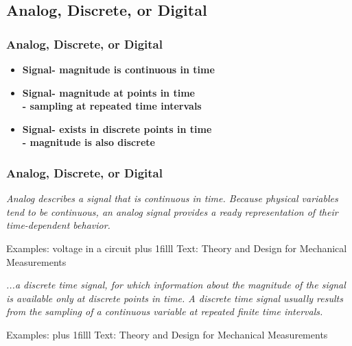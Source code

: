 \documentclass[fleqn]{beamer} %
\newcommand{\sectionIsubsectionIItitle}{Analog, Discrete, or Digital}
\newcommand{\btVFill}{\vskip0pt plus 1filll}
\newcommand{\uhspc}{\underline{\hspace{20 mm}}}
\begin{document}
		\subsection{\sectionIsubsectionIItitle}\label{sectionIsubsectionII}

			\begin{frame}
				\frametitle{\sectionIsubsectionIItitle}

					    \begin{itemize}
			\item \textbf{\uhspc Signal- magnitude is continuous in time }  \vspace{3mm} \\
			\item \textbf{\uhspc Signal- magnitude at points in time}  \vspace{3mm} \\
			\textbf{ \hspace*{15mm} - sampling at repeated time intervals}  \vspace{3mm} \\
			\item \textbf{\uhspc Signal- exists in discrete points in time}  \vspace{3mm} \\
			\textbf{ \hspace*{15mm} - magnitude is also discrete}  \vspace{3mm} \\
		\end{itemize}



			\end{frame}

			\begin{frame}
				\frametitle{\sectionIsubsectionIItitle}


		{\it {\RD Analog} describes a signal that is
		continuous in time. Because physical variables tend to be continuous, an analog signal provides a
		ready representation of their time-dependent behavior. }

		\vspace{30mm}
		Examples: voltage in a circuit
		\btVFill
		\tiny{Text: Theory and Design for Mechanical Measurements}	
				


			\end{frame}


			\begin{frame}

						\bigskip  
			
		{\it ...a {\GR discrete time} signal, for which information about the
		magnitude of the signal is available only at discrete points in time. A discrete time signal usually
		results from the sampling of a continuous variable at repeated finite time intervals. }

		\vspace{30mm}
		Examples:
		\btVFill
		\tiny{Text: Theory and Design for Mechanical Measurements}	

			\end{frame}
\end{document}

